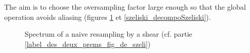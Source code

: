 	The aim is to choose the oversampling factor large enough so that the global operation avoids aliasing (figures \ref{szeliski_decompoNaive} et \ref{szeliski_decompoSzeliski}).
	\label{label_des_deux_prems_fig_de_szeli}
	\begin{figure}
		\centering
		\caption{Spectrum of a naive resampling by a shear (cf. partie \ref{label_des_deux_prems_fig_de_szeli})}
		\label{szeliski_decompoNaive}
	\end{figure}
		
